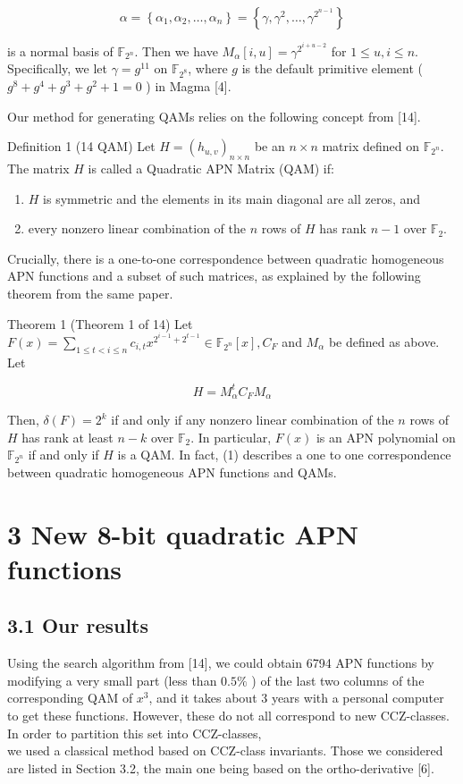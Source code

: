 \documentclass[10pt]{article}
\begin{document}
$$
\alpha=\left\{\alpha_{1}, \alpha_{2}, \ldots, \alpha_{n}\right\}=\left\{\gamma, \gamma^{2}, \ldots, \gamma^{2^{n-1}}\right\}
$$

is a normal basis of $\mathbb{F}_{2^{n}}$. Then we have $M_{\alpha}[i, u]=\gamma^{2^{i+u-2}}$ for $1 \leq u, i \leq n$. Specifically, we let $\gamma=g^{11}$ on $\mathbb{F}_{2^{8}}$, where $g$ is the default primitive element ( $g^{8}+g^{4}+g^{3}+g^{2}+1=0$ ) in Magma [4].

Our method for generating QAMs relies on the following concept from [14].

Definition 1 (14 QAM) Let $H=\left(h_{u, v}\right)_{n \times n}$ be an $n \times n$ matrix defined on $\mathbb{F}_{2^{n}}$. The matrix $H$ is called a Quadratic APN Matrix (QAM) if:

\begin{enumerate}
  \item $H$ is symmetric and the elements in its main diagonal are all zeros, and
  \item every nonzero linear combination of the $n$ rows of $H$ has rank $n-1$ over $\mathbb{F}_{2}$.
\end{enumerate}

Crucially, there is a one-to-one correspondence between quadratic homogeneous APN functions and a subset of such matrices, as explained by the following theorem from the same paper.

Theorem 1 (Theorem 1 of 14) Let $F(x)=\sum_{1 \leq t<i \leq n} c_{i, t} x^{2^{i-1}+2^{t-1}} \in \mathbb{F}_{2^{n}}[x], C_{F}$ and $M_{\alpha}$ be defined as above. Let


\begin{equation*}
H=M_{\alpha}^{t} C_{F} M_{\alpha} \tag{1}
\end{equation*}


Then, $\delta(F)=2^{k}$ if and only if any nonzero linear combination of the $n$ rows of $H$ has rank at least $n-k$ over $\mathbb{F}_{2}$. In particular, $F(x)$ is an APN polynomial on $\mathbb{F}_{2^{n}}$ if and only if $H$ is a QAM. In fact, (1) describes a one to one correspondence between quadratic homogeneous APN functions and QAMs.

\section*{3 New 8-bit quadratic APN functions}
\subsection*{3.1 Our results}
Using the search algorithm from [14], we could obtain 6794 APN functions by modifying a very small part (less than $0.5 \%$ ) of the last two columns of the corresponding QAM of $x^{3}$, and it takes about 3 years with a personal computer to get these functions. However, these do not all correspond to new CCZ-classes. In order to partition this set into CCZ-classes,\\[0pt]
we used a classical method based on CCZ-class invariants. Those we considered are listed in Section 3.2, the main one being based on the ortho-derivative [6].
\end{document}
